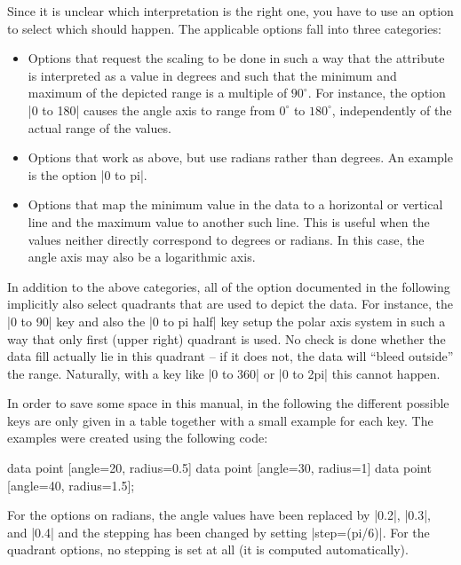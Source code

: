 Since it is unclear which interpretation is the right one, you have to
use an option to select which should happen. The applicable options
fall into three categories:

\begin{itemize}
\item Options that request the scaling to be done in such a way that
  the attribute is interpreted as a value in degrees and such that the
  minimum and maximum of the depicted range is a multiple of
  $90^\circ$. For instance, the option |0 to 180| causes the angle
  axis to range from $0^\circ$ to $180^\circ$, independently of the
  actual range of the values.
\item Options that work as above, but use radians rather than
  degrees. An example is the option |0 to pi|.
\item Options that map the minimum value in the data to a horizontal
  or vertical line and the maximum value to another such line. This is
  useful when the values neither directly correspond to degrees or
  radians. In this case, the angle axis may also be a logarithmic
  axis. 
\end{itemize}

In addition to the above categories, all of the option documented in
the following implicitly also select quadrants that are used to depict
the data. For instance, the |0 to 90| key and also the |0 to pi half|
key setup the polar axis system in such a way that only first (upper
right) quadrant is used. No check is done whether the data fill
actually lie in this quadrant -- if it does not, the data will ``bleed
outside'' the range. Naturally, with a key like |0 to 360| or
|0 to 2pi| this cannot happen.

In order to save some space in this manual, in the following the
different possible keys are only given in a table together with a
small example for each key. The examples were created using the
following code:

\begin{codeexample}[]
\tikz \datavisualization [
  scientific polar axes={
    clean,
    0 to 90  %
  },
  angle axis={ticks={step=30}},
  radius axis={length=1cm, ticks={step=1}},
  visualize as scatter]
data point [angle=20, radius=0.5]
data point [angle=30, radius=1]
data point [angle=40, radius=1.5];
\end{codeexample}

For the options on radians, the angle values have been replaced by
|0.2|, |0.3|, and |0.4| and the stepping has been changed by setting
|step=(pi/6)|. For the quadrant options, no stepping is set at all (it
is computed automatically).

